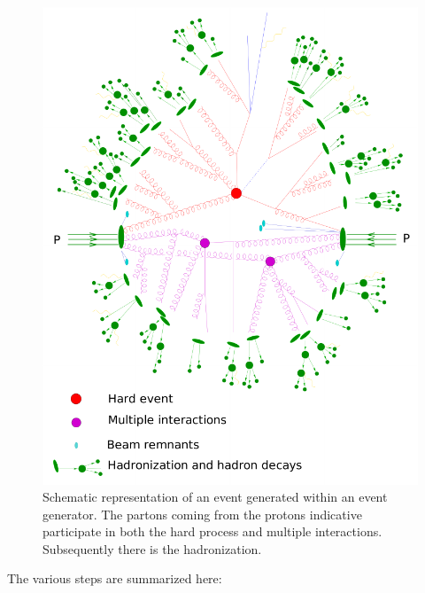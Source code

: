 \begin{figure}
\centering
\includegraphics[scale= 1]{../Cap3/Fig_MC/generalMC}
\caption{Schematic representation of an event generated within an event generator. The partons coming from the protons indicative participate in both the hard process and multiple interactions. Subsequently there is the hadronization.}
\label{qqqq}
\end{figure}
The various steps are summarized here:

